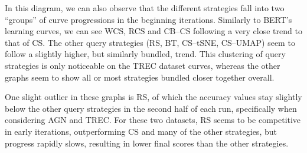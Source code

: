 \documentclass[english,bachelor,ul]{webisthesis} %
\begin{document}
In this diagram, we can also observe that the different strategies fall into two ``groups'' of curve progressions in the beginning iterations. Similarly to BERT's learning curves, we can see WCS, RCS and CB--CS following a very close trend to that of CS. The other query strategies (RS, BT, CS--tSNE, CS--UMAP) seem to follow a slightly higher, but similarly bundled, trend. This clustering of query strategies is only noticeable on the TREC dataset curves, whereas the other graphs seem to show all or most strategies bundled closer together overall.

One slight outlier in these graphs is RS, of which the accuracy values stay slightly below the other query strategies in the second half of each run, specifically when considering AGN and TREC. For these two datasets, RS seems to be competitive in early iterations, outperforming CS and many of the other strategies, but progress rapidly slows, resulting in lower final scores than the other strategies.


\clearpage \newpage
\end{document}
